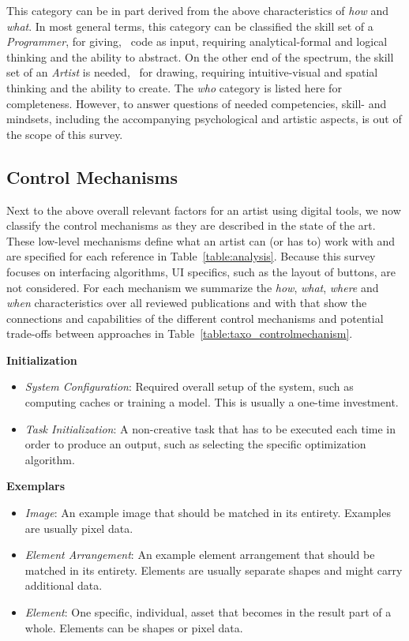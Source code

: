 This category can be in part derived from the above characteristics of \textit{how} and \textit{what}. In most general terms, this category can be classified the skill set of a \textit{Programmer}, for giving, \eg~code as input, requiring analytical-formal and logical thinking and the ability to abstract. On the other end of the spectrum, the skill set of an \textit{Artist} is needed, \eg~for drawing, requiring intuitive-visual and spatial thinking and the ability to create. The \textit{who} category is listed here for completeness. However, to answer questions of needed competencies, skill- and mindsets, including the accompanying psychological and artistic aspects, is out of the scope of this survey.

\subsection{Control Mechanisms}\label{subsec:taxo_control_mechanism}
Next to the above overall relevant factors for an artist using digital tools, we now classify the control mechanisms as they are described in the state of the art. These low-level mechanisms define what an artist can (or has to) work with and are specified for each reference in Table~\ref{table:analysis}. Because this survey focuses on interfacing algorithms, UI specifics, such as the layout of buttons, are not considered. For each mechanism we summarize the \textit{how}, \textit{what}, \textit{where} and \textit{when} characteristics over all reviewed publications and with that show the connections and capabilities of the different control mechanisms and potential trade-offs between approaches in Table~\ref{table:taxo_controlmechanism}.

\noindent\textbf{Initialization}
\begin{itemize}
    \item \textit{System Configuration}: Required overall setup of the system, such as computing caches or training a model. This is usually a one-time investment.
    \item \textit{Task Initialization}: A non-creative task that has to be executed each time in order to produce an output, such as selecting the specific optimization algorithm.
\end{itemize}

\noindent\textbf{Exemplars}
\begin{itemize}
    \item \textit{Image}: An example image that should be matched in its entirety. Examples are usually pixel data.
    \item \textit{Element Arrangement}: An example element arrangement that should be matched in its entirety. Elements are usually separate shapes and might carry additional data.
    \item \textit{Element}: One specific, individual, asset that becomes in the result part of a whole. Elements can be shapes or pixel data.
\end{itemize}

